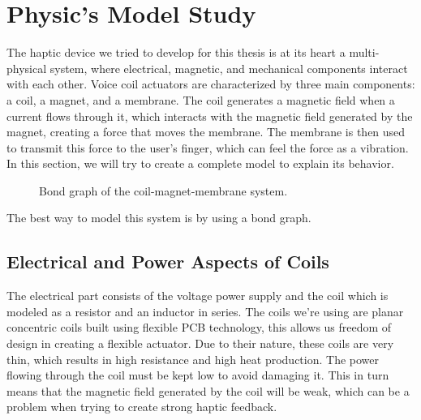 \section{Physic's Model Study}
The haptic device we tried to develop for this thesis is at its heart a multi-physical system, where electrical, magnetic, and mechanical components interact with each other.
Voice coil actuators are characterized by three main components: a coil, a magnet, and a membrane. The coil generates a magnetic field when a current flows through it, which interacts with the magnetic field generated by the magnet, creating a force that moves the membrane. The membrane is then used to transmit this force to the user's finger, which can feel the force as a vibration.
In this section, we will try to create a complete model to explain its behavior.
\begin{figure}[H]
    \centering
    \resizebox{1\linewidth}{!}{
        
    } %
    \caption{Bond graph of the coil-magnet-membrane system.}
    \label{fig: Total_bond-graph}
\end{figure}
The best way to model this system is by using a bond graph.

\subsection{Electrical and Power Aspects of Coils}
The electrical part consists of the voltage power supply and the coil which is modeled as a resistor and an inductor in series. The coils we're using are planar concentric coils built using flexible PCB technology, this allows us freedom of design in creating a flexible actuator.
Due to their nature, these coils are very thin, which results in high resistance and high heat production. The power flowing through the coil must be kept low to avoid damaging it. This in turn means that the magnetic field generated by the coil will be weak, which can be a problem when trying to create strong haptic feedback.

